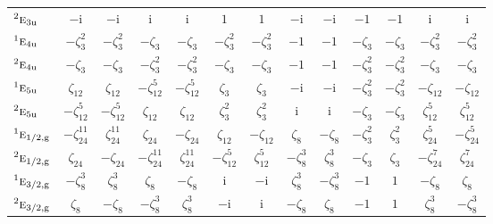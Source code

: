 \documentclass[10pt,a4paper]{article}
\makeatletter
\def\grouprule#1#2{\noalign{\marks\LTgroupmarks{\the\belowrulesep}\nobreak\vskip#1%
  \vskip\aboverulesep}\multispan\LT@cols\unskip{\leaders\hrule\@height#2\hfill\kern\z@}\cr
  \noalign{\penalty\LTrulebreak\vskip\belowrulesep\global\@lastruleclass\z@}}
\numberwithin{equation}{section}
\newcommand{\irr}[1]{\text{\normalfont\scshape #1}}
\newcommand{\conjpair}[1]{{}^{#1}}
\newcommand{\ptag}[1]{\mathrm{#1}}
\newcommand{\iunit}{\mathrm{i}}
\newcommand{\rootunity}[1]{\zeta_{#1}}
\makeatother
\begin{document}
{\begin{longtable}{@{}lcccccccccccc@{}}
$\conjpair{2}\irr{e}_{3\ptag{u}}$ & $-\iunit{}$ & $-\iunit{}$ & $\iunit{}$ & $\iunit{}$ & $1$ & $1$ & $-\iunit{}$ & $-\iunit{}$ & $-1$ & $-1$ & $\iunit{}$ & $\iunit{}$\\
$\conjpair{1}\irr{e}_{4\ptag{u}}$ & $-\rootunity{3}^{2}$ & $-\rootunity{3}^{2}$ & $-\rootunity{3}$ & $-\rootunity{3}$ & $-\rootunity{3}^{2}$ & $-\rootunity{3}^{2}$ & $-1$ & $-1$ & $-\rootunity{3}$ & $-\rootunity{3}$ & $-\rootunity{3}^{2}$ & $-\rootunity{3}^{2}$\\
$\conjpair{2}\irr{e}_{4\ptag{u}}$ & $-\rootunity{3}$ & $-\rootunity{3}$ & $-\rootunity{3}^{2}$ & $-\rootunity{3}^{2}$ & $-\rootunity{3}$ & $-\rootunity{3}$ & $-1$ & $-1$ & $-\rootunity{3}^{2}$ & $-\rootunity{3}^{2}$ & $-\rootunity{3}$ & $-\rootunity{3}$\\
$\conjpair{1}\irr{e}_{5\ptag{u}}$ & $\rootunity{12}$ & $\rootunity{12}$ & $-\rootunity{12}^{5}$ & $-\rootunity{12}^{5}$ & $\rootunity{3}$ & $\rootunity{3}$ & $-\iunit{}$ & $-\iunit{}$ & $-\rootunity{3}^{2}$ & $-\rootunity{3}^{2}$ & $-\rootunity{12}$ & $-\rootunity{12}$\\
$\conjpair{2}\irr{e}_{5\ptag{u}}$ & $-\rootunity{12}^{5}$ & $-\rootunity{12}^{5}$ & $\rootunity{12}$ & $\rootunity{12}$ & $\rootunity{3}^{2}$ & $\rootunity{3}^{2}$ & $\iunit{}$ & $\iunit{}$ & $-\rootunity{3}$ & $-\rootunity{3}$ & $\rootunity{12}^{5}$ & $\rootunity{12}^{5}$\\
\grouprule{0pt}{\lightrulewidth}
$\conjpair{1}\irr{e}_{1/2,\ptag{g}}$ & $-\rootunity{24}^{11}$ & $\rootunity{24}^{11}$ & $\rootunity{24}$ & $-\rootunity{24}$ & $\rootunity{12}$ & $-\rootunity{12}$ & $\rootunity{8}$ & $-\rootunity{8}$ & $-\rootunity{3}^{2}$ & $\rootunity{3}^{2}$ & $\rootunity{24}^{5}$ & $-\rootunity{24}^{5}$\\
$\conjpair{2}\irr{e}_{1/2,\ptag{g}}$ & $\rootunity{24}$ & $-\rootunity{24}$ & $-\rootunity{24}^{11}$ & $\rootunity{24}^{11}$ & $-\rootunity{12}^{5}$ & $\rootunity{12}^{5}$ & $-\rootunity{8}^{3}$ & $\rootunity{8}^{3}$ & $-\rootunity{3}$ & $\rootunity{3}$ & $-\rootunity{24}^{7}$ & $\rootunity{24}^{7}$\\
$\conjpair{1}\irr{e}_{3/2,\ptag{g}}$ & $-\rootunity{8}^{3}$ & $\rootunity{8}^{3}$ & $\rootunity{8}$ & $-\rootunity{8}$ & $\iunit{}$ & $-\iunit{}$ & $\rootunity{8}^{3}$ & $-\rootunity{8}^{3}$ & $-1$ & $1$ & $-\rootunity{8}$ & $\rootunity{8}$\\
$\conjpair{2}\irr{e}_{3/2,\ptag{g}}$ & $\rootunity{8}$ & $-\rootunity{8}$ & $-\rootunity{8}^{3}$ & $\rootunity{8}^{3}$ & $-\iunit{}$ & $\iunit{}$ & $-\rootunity{8}$ & $\rootunity{8}$ & $-1$ & $1$ & $\rootunity{8}^{3}$ & $-\rootunity{8}^{3}$\\

\end{longtable}}
\end{document}
